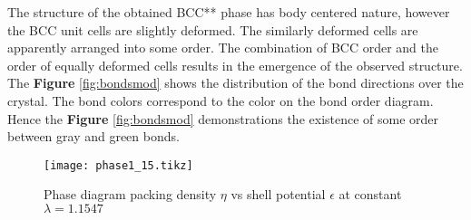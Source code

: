 The structure of the obtained BCC** phase has body centered nature, however the BCC unit cells are slightly deformed. The similarly  deformed cells are apparently arranged into some order. The combination of BCC order and the order of equally deformed cells results in the emergence of the observed structure. The \textbf{Figure} \ref{fig:bondsmod} shows the distribution of the bond directions over the crystal. The bond colors  correspond to the color on the bond order diagram. Hence the \textbf{Figure} \ref{fig:bondsmod} demonstrations the existence of some order between gray and green bonds.

\begin{figure}[ht]
\centering
\texttt{[image: phase1\_15.tikz]}
\caption{Phase diagram packing density $\eta$ vs shell potential $\epsilon$ at constant $\lambda=1.1547$} \label{fig:phase_eta_eps}
\end{figure}





